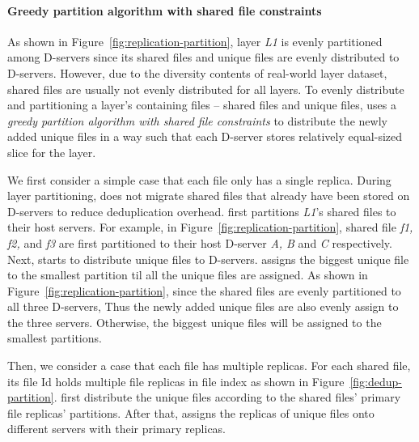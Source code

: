 %
\paragraph{Greedy partition algorithm with shared file constraints}
As shown in Figure~\ref{fig:replication-partition},
layer \emph{L1} is evenly partitioned among D-servers 
since its shared files and unique files are evenly distributed to D-servers. 
However,
due to the diversity contents of real-world layer dataset,
shared files are usually not evenly distributed for all layers. 
To evenly distribute and partitioning a layer's containing files -- shared files and unique files,
%
\sysname uses a \emph{greedy partition algorithm with shared file constraints} to
 distribute the newly added unique files in a way such that
each D-server stores relatively equal-sized slice for the layer.

We first consider a simple case that each file only has a single replica.
During layer partitioning,
\sysname does not migrate shared files that already have been stored on D-servers 
to
reduce deduplication overhead.
\sysname first partitions \emph{L1}'s shared files to their host servers.
For example, in Figure~\ref{fig:replication-partition},
shared file \emph{f1, f2,} and \emph{f3} are first 
partitioned to their host D-server \emph{A, B} and \emph{C} respectively. 
Next,
\sysname starts to distribute unique files to D-servers.
\sysname
assigns the biggest unique file to the smallest partition
til all the unique files are assigned.
As shown in Figure~\ref{fig:replication-partition},
since the shared files are evenly partitioned to all three D-servers,
Thus the newly added unique files are also evenly assign to
the three servers.
 Otherwise, the biggest unique files will be assigned to the smallest partitions.

Then, we consider a case that each file has multiple replicas.
For each shared file,
its file Id holds multiple file replicas in file index as shown in Figure~\ref{fig:dedup-partition}.
\sysname first distribute the unique files
according to the shared files' primary file replicas' partitions.
After that,
\sysname assigns the replicas of unique files 
onto different servers with their primary replicas.


